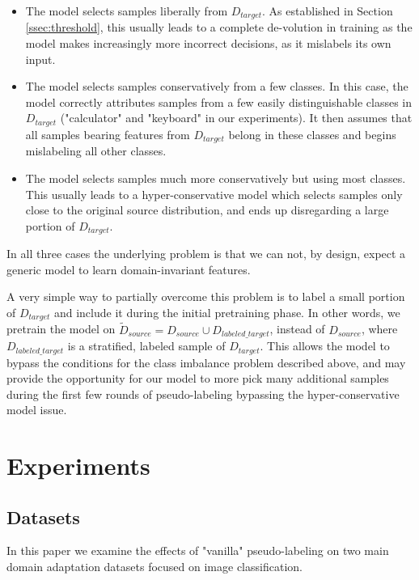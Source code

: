 \documentclass[12pt, a4paper]{article}
\begin{document}
	\begin{itemize}
		\item The model selects samples liberally from $D_{target}$. As established in Section \ref{ssec:threshold}, this usually leads to a complete de-volution in training as the model makes increasingly more incorrect decisions, as it mislabels its own input.
		
		\item The model selects samples conservatively from a few classes. In this case, the model correctly attributes samples from a few easily distinguishable classes in $D_{target}$ ("calculator" and "keyboard" in our experiments). It then assumes that all samples bearing features from $D_{target}$ belong in these classes and begins mislabeling all other classes.
		
		\item The model selects samples much more conservatively but using most classes. This usually leads to a hyper-conservative model which selects samples only close to the original source distribution, and ends up disregarding a large portion of $D_{target}$.
	\end{itemize}

	In all three cases the underlying problem is that we can not, by design, expect a generic model to learn domain-invariant features. 
	
	A very simple way to partially overcome this problem is to label a small portion of $D_{target}$ and include it during the initial pretraining phase. In other words, we pretrain the model on $\tilde{D}_{source} = D_{source} \cup D_{labeled\_target}$, instead of $D_{source}$, where $D_{labeled\_target}$ is a stratified, labeled sample of $D_{target}$. This allows the model to bypass the conditions for the class imbalance problem described above, and may provide the opportunity for our model to more pick many additional samples during the first few rounds of pseudo-labeling bypassing the hyper-conservative model issue.
	
	
	\section{Experiments}
	
	\subsection{Datasets}
	
	In this paper we examine the effects of "vanilla" pseudo-labeling on two main domain adaptation datasets focused on image classification. 
	
\end{document}
